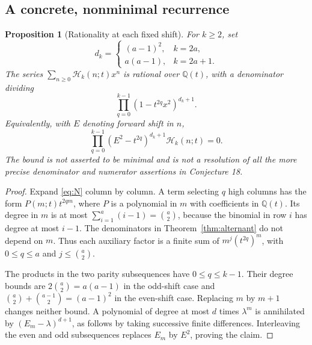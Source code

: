 \documentclass[11pt]{article}
\newtheorem{proposition}[theorem]{Proposition}
\theoremstyle{definition}
\theoremstyle{remark}
\newcommand{\Q}{\mathbb Q}
\newcommand{\Ht}{\mathcal H}
\theoremstyle{definition}
\theoremstyle{plain}
\numberwithin{equation}{section}
\begin{document}
\subsection{A concrete, nonminimal recurrence}
\begin{proposition}[Rationality at each fixed shift]
\label{prop:recurrence}
For $k\ge2$, set
\[
 d_k=\begin{cases}(a-1)^2,&k=2a,\\ a(a-1),&k=2a+1.\end{cases}
\]
The series $\sum_{n\ge0}\Ht_k(n;t)x^n$ is rational over $\Q(t)$,
with a denominator dividing
\begin{equation}
 \prod_{q=0}^{k-1}(1-t^{2q}x^2)^{d_k+1}.
 \label{eq:coarse-den}
\end{equation}
Equivalently, with $E$ denoting forward shift in $n$,
\begin{equation}
 \prod_{q=0}^{k-1}(E^2-t^{2q})^{d_k+1}\Ht_k(n;t)=0.
 \label{eq:coarse-rec}
\end{equation}
The bound is not asserted to be minimal and is not a resolution of all the
more precise denominator and numerator assertions in Conjecture 18.
\end{proposition}
\begin{proof}
Expand \eqref{eq:N} column by column. A term selecting $q$ high columns
has the form $P(m;t)t^{2qm}$, where $P$ is a polynomial in $m$ with
coefficients in $\Q(t)$. Its degree in $m$ is at most
$\sum_{i=1}^a(i-1)=\binom a2$, because the binomial in row $i$ has degree
at most $i-1$. The denominators in Theorem~\ref{thm:alternant} do not
depend on $m$. Thus each auxiliary factor is a finite sum of
$m^j(t^{2q})^m$, with $0\le q\le a$ and $j\le\binom a2$.

The products in the two parity subsequences have $0\le q\le k-1$.
Their degree bounds are $2\binom a2=a(a-1)$ in the odd-shift case and
$\binom a2+\binom{a-1}{2}=(a-1)^2$ in the even-shift case.
Replacing $m$ by $m+1$ changes neither bound. A polynomial of degree at
most $d$ times $\lambda^m$ is annihilated by $(E_m-\lambda)^{d+1}$,
as follows by taking successive finite differences. Interleaving the
even and odd subsequences replaces $E_m$ by $E^2$, proving the claim.
\end{proof}

\noindent[Added 29 September 2026, batch 56: in the notation of this
proposition, the exact reduced denominator is $\prod_{q=0}^{k-1}(1-t^qx)^{1+\lfloor q(k-1-q)/2\rfloor}$, with no
cancellation over $\Q(t)$ or at any real $t\notin\{0,\pm1\}$
(Theorem~\ref{rs:thm:recurrence-main}; Part~II writes $z$ for the
variable $x$). Part~II also gives the numerator degree and reciprocity sign
(Theorem~\ref{rs:thm:numerator}), the signed denominator for odd $k$
(Theorem~\ref{rs:thm:signed}), and the reduced denominators at $t=0,\pm1$
(Theorem~\ref{rs:thm:real}). Cigler's denominators (84) and (86) are
minimal; the positive sign printed in his (85) is false when $a$ is even,
the correct sign being $(-1)^{a+1}$.]
\end{document}
